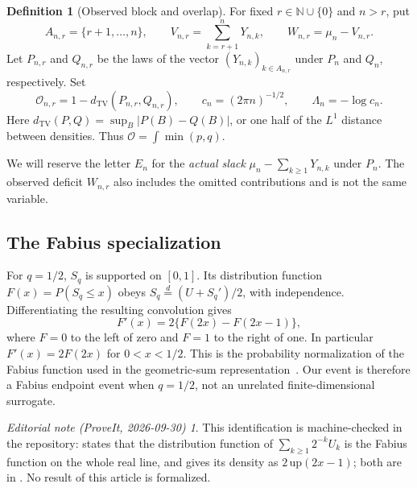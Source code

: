 \documentclass[11pt,oneside]{article}
\numberwithin{equation}{section}
\theoremstyle{plain}
\theoremstyle{definition}
\newtheorem{definition}[theorem]{Definition}
\theoremstyle{remark}
\newtheorem*{ednote}{Editorial note (ProveIt, 2026-09-30)}
\newcommand{\N}{\mathbb N}
\newcommand{\TV}{d_{\mathrm{TV}}}
\newcommand{\OO}{\mathcal O}
\begin{document}
\begin{definition}[Observed block and overlap]
For fixed $r\in\N\cup\{0\}$ and $n>r$, put
\[
 A_{n,r}=\{r+1,\ldots,n\},\qquad
 V_{n,r}=\sum_{k=r+1}^nY_{n,k},\qquad W_{n,r}=\mu_n-V_{n,r}.
\]
Let $P_{n,r}$ and $Q_{n,r}$ be the laws of the vector
$(Y_{n,k})_{k\in A_{n,r}}$ under $P_n$ and $Q_n$, respectively. Set
\begin{equation}\label{eq:overlapdef}
 \OO_{n,r}=1-\TV(P_{n,r},Q_{n,r}),\qquad
 c_n=(2\pi n)^{-1/2},\qquad \Lambda_n=-\log c_n.
\end{equation}
Here $\TV(P,Q)=\sup_B|P(B)-Q(B)|$, or one half of the $L^1$ distance
between densities. Thus $\OO=\int\min(p,q)$.
\end{definition}

We will reserve the letter $E_n$ for the \emph{actual slack}
$\mu_n-\sum_{k\ge1}Y_{n,k}$ under $P_n$. The observed deficit $W_{n,r}$
also includes the omitted contributions and is not the same variable.

\subsection{The Fabius specialization}
For $q=1/2$, $S_q$ is supported on $[0,1]$. Its distribution function
$F(x)=P(S_q\le x)$ obeys $S_q\overset d=(U+S_q')/2$, with independence.
Differentiating the resulting convolution gives
\[
 F'(x)=2\{F(2x)-F(2x-1)\},
\]
where $F=0$ to the left of zero and $F=1$ to the right of one. In
particular $F'(x)=2F(2x)$ for $0<x<1/2$. This is the probability
normalization of the Fabius function used in the geometric-sum
representation~\cite{arias}. Our event is therefore a Fabius endpoint
event when $q=1/2$, not an unrelated finite-dimensional surrogate.
\begin{ednote}
This identification is machine-checked in the repository:
states that the distribution function of $\sum_{k\ge1}2^{-k}U_k$ is the
Fabius function on the whole real line, and
gives its density as $2\,\mathrm{up}(2x-1)$; both are in
.
No result of this article is formalized.
\end{ednote}
\end{document}
